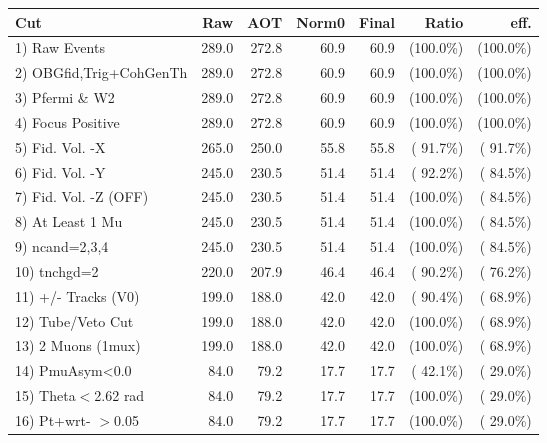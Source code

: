  \begin{table}[h!]\centering
 \begin{tabular}{||l||r|r|r|r|r|r||}
 \hline
 \hline
 Cut & Raw & AOT & Norm0 & Final & Ratio & eff.       \\
 \hline
  1) Raw Events           &        289.0 &        272.8 &         60.9 &         60.9 & (100.0\%) & (100.0\%) \\
  2) OBGfid,Trig+CohGenTh &        289.0 &        272.8 &         60.9 &         60.9 & (100.0\%) & (100.0\%) \\
  3) Pfermi \& W2         &        289.0 &        272.8 &         60.9 &         60.9 & (100.0\%) & (100.0\%) \\
  4) Focus Positive       &        289.0 &        272.8 &         60.9 &         60.9 & (100.0\%) & (100.0\%) \\
  5) Fid. Vol. -X         &        265.0 &        250.0 &         55.8 &         55.8 & ( 91.7\%) & ( 91.7\%) \\
  6) Fid. Vol. -Y         &        245.0 &        230.5 &         51.4 &         51.4 & ( 92.2\%) & ( 84.5\%) \\
  7) Fid. Vol. -Z (OFF)   &        245.0 &        230.5 &         51.4 &         51.4 & (100.0\%) & ( 84.5\%) \\
  8) At Least 1 Mu        &        245.0 &        230.5 &         51.4 &         51.4 & (100.0\%) & ( 84.5\%) \\
  9) ncand=2,3,4          &        245.0 &        230.5 &         51.4 &         51.4 & (100.0\%) & ( 84.5\%) \\
 10) tnchgd=2             &        220.0 &        207.9 &         46.4 &         46.4 & ( 90.2\%) & ( 76.2\%) \\
 11) +/- Tracks (V0)      &        199.0 &        188.0 &         42.0 &         42.0 & ( 90.4\%) & ( 68.9\%) \\
 12) Tube/Veto Cut        &        199.0 &        188.0 &         42.0 &         42.0 & (100.0\%) & ( 68.9\%) \\
 13) 2 Muons (1mux)       &        199.0 &        188.0 &         42.0 &         42.0 & (100.0\%) & ( 68.9\%) \\
 14) PmuAsym<0.0          &         84.0 &         79.2 &         17.7 &         17.7 & ( 42.1\%) & ( 29.0\%) \\
 15) Theta$<$2.62 rad     &         84.0 &         79.2 &         17.7 &         17.7 & (100.0\%) & ( 29.0\%) \\
 16) Pt+wrt- $>$0.05      &         84.0 &         79.2 &         17.7 &         17.7 & (100.0\%) & ( 29.0\%) \\

\end{tabular}
\end{table}
